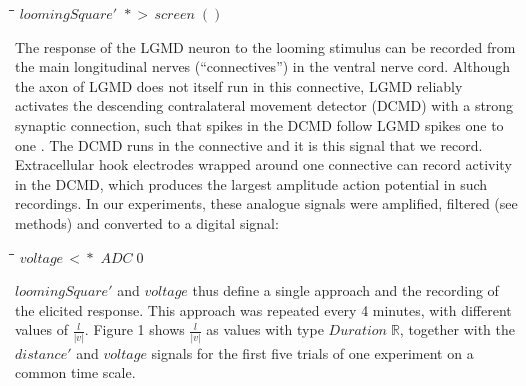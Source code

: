 \documentclass[11pt]{article}
\newlength{\lwidth}\setlength{\lwidth}{4.5cm}
\newlength{\cwidth}\setlength{\cwidth}{8mm} %
\newcommand{\Conid}[1]{\mathit{#1}}
\newcommand{\Varid}[1]{\mathit{#1}}
\begin{document}
\begin{tabbing}
\qquad\=\hspace{\lwidth}\=\hspace{\cwidth}\=\+\kill
${\Varid{loomingSquare'}\,\,*\!\!\!>\,\Varid{screen}\;()}$
\end{tabbing}
The response of the LGMD neuron to the looming stimulus can be
recorded from the main longitudinal nerves (``connectives'') in the
ventral nerve cord. Although the axon of LGMD does not itself run in
this connective, LGMD reliably activates the descending contralateral
movement detector (DCMD) with a strong synaptic connection, such that
spikes in the DCMD follow LGMD spikes one to one
\cite{O'Shea1974}. The DCMD runs in the connective and it is this
signal that we record. Extracellular hook electrodes wrapped around
one connective can record activity in the DCMD, which produces the
largest amplitude action potential in such recordings. In our
experiments, these analogue signals were amplified, filtered (see
methods) and converted to a digital signal:

\begin{tabbing}
\qquad\=\hspace{\lwidth}\=\hspace{\cwidth}\=\+\kill
${\Varid{voltage}\,<\!\!\!*\,\,\Conid{ADC}\;\mathrm{0}}$
\end{tabbing}
\ensuremath{\Varid{loomingSquare'}} and \ensuremath{\Varid{voltage}} thus define a single approach and the
recording of the elicited response. This approach was repeated every 4
minutes, with different values of $\frac{l}{|v|}$. Figure 1 shows
$\frac{l}{|v|}$ as values with type \ensuremath{\Conid{Duration}\;\mathbb{R}}, together with the
\ensuremath{\Varid{distance'}} and \ensuremath{\Varid{voltage}} signals for the first five trials of one
experiment on a common time scale.
\end{document}
